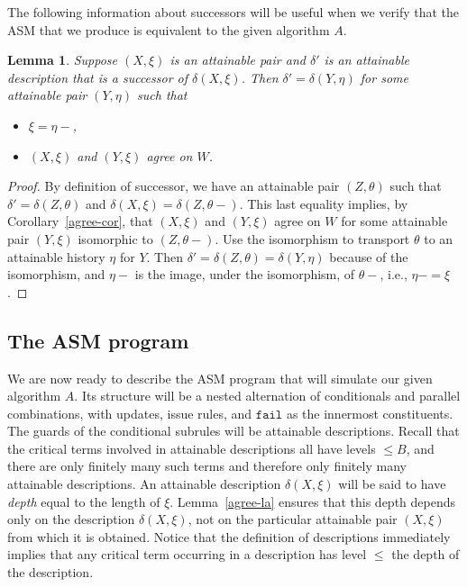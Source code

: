\documentclass{LMCS}
\newtheorem{la}[thm]{Lemma}
\theoremstyle{definition}
\newenvironment{ls}{\begin{itemize}}{\end{itemize}}
\newcommand{\ttt}[1]{\ensuremath{\mathtt {#1}}}
\begin{document}
The following information about successors will be useful when we
verify that the ASM that we produce is equivalent to the given
algorithm $A$.

\begin{la}   \label{successor}
  Suppose $(X,\xi)$ is an attainable pair and $\delta'$ is an
  attainable description that is a successor of $\delta(X,\xi)$.
  Then $\delta'=\delta(Y,\eta)$ for some attainable pair $(Y,\eta)$
  such that
  \begin{ls}
    \item $\xi=\eta-$,
    \item $(X,\xi)$ and $(Y,\xi)$ agree on $W$.
  \end{ls}
\end{la}

\begin{proof}
By definition of successor, we have an attainable pair $(Z,\theta)$
such that $\delta'=\delta(Z,\theta)$ and
$\delta(X,\xi)=\delta(Z,\theta-)$.  This last equality implies, by
Corollary~\ref{agree-cor}, that $(X,\xi)$ and $(Y,\xi)$ agree on $W$
for some attainable pair $(Y,\xi)$ isomorphic to $(Z,\theta-)$.  Use
the isomorphism to transport $\theta$ to an attainable history $\eta$
for $Y$.  Then $\delta'=\delta(Z,\theta)=\delta(Y,\eta)$ because of
the isomorphism, and $\eta-$ is the image, under the isomorphism, of
$\theta-$, i.e., $\eta-=\xi$.
\end{proof}

\subsection{The ASM program}

We are now ready to describe the ASM program that will simulate our
given algorithm $A$.  Its structure will be a nested alternation of
conditionals and parallel combinations, with updates, issue rules, and
\ttt{fail} as the innermost constituents.  The guards of the
conditional subrules will be attainable descriptions.  Recall that the
critical terms involved in attainable descriptions all have levels
$\leq B$, and there are only finitely many such terms and therefore
only finitely many attainable descriptions.  An attainable description
$\delta(X,\xi)$ will be said to have \emph{depth} equal to the length
of $\xi$.  Lemma~\ref{agree-la} ensures that this depth depends only
on the description $\delta(X,\xi)$, not on the particular attainable
pair $(X,\xi)$ from which it is obtained.  Notice that the definition
of descriptions immediately implies that any critical term occurring
in a description has level $\leq$ the depth of the description.
\end{document}

